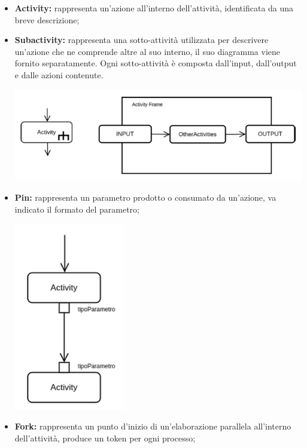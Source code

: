 \begin{itemize}
\begin{center}
\begin{minipage}{0.3\textwidth}
		\end{minipage}
	\end{center}
	\item \textbf{Activity:} rappresenta un'azione all'interno dell'attività, identificata da una breve descrizione;
	\item \textbf{Subactivity:} rappresenta una sotto-attività utilizzata per descrivere un'azione che ne comprende altre al suo interno, il suo diagramma viene fornito separatamente. Ogni sotto-attività è composta dall'input, dall'output e dalle azioni contenute.
	\begin{center}
		\includegraphics[scale=0.4]{Immagini/UML/Sottoattivita}
	\end{center}
	\item \textbf{Pin:} rappresenta un parametro prodotto o consumato da un'azione, va indicato il formato del parametro;
	\begin{center}
		\centering
		\includegraphics[scale=0.4]{Immagini/UML/Pin}
	\end{center}
	\item \textbf{Fork:} rappresenta un punto d'inizio di un'elaborazione parallela all'interno dell'attività, produce un token per ogni processo;

\end{itemize}
